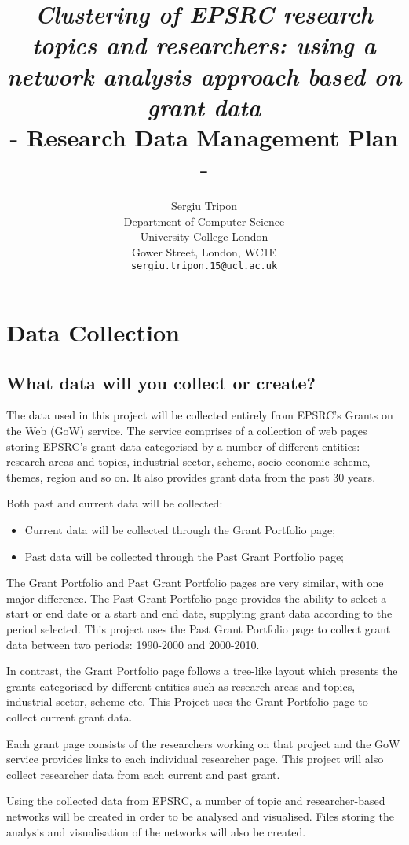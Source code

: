 \documentclass{article} %
\title{\textit{Clustering of EPSRC research topics and researchers: \normalfont using a network analysis approach based on grant data}\\- Research Data Management Plan -}
\author{
Sergiu Tripon\\
Department of Computer Science\\
University College London\\
Gower Street, London, WC1E\\
\texttt{sergiu.tripon.15@ucl.ac.uk}\\
}
\begin{document}
\maketitle

\section{Data Collection}

\subsection{What data will you collect or create?}

The data used in this project will be collected entirely from EPSRC’s Grants on the Web (GoW) service. The service comprises of a collection of web pages storing EPSRC’s grant data categorised by a number of different entities: research areas and topics, industrial sector, scheme, socio-economic scheme, themes, region and so on. It also provides grant data from the past 30 years.

Both past and current data will be collected:

\begin{itemize}
    \item Current data will be collected through the Grant Portfolio page;
    \item Past data will be collected through the Past Grant Portfolio page;
\end{itemize}

The Grant Portfolio and Past Grant Portfolio pages are very similar, with one major difference. The Past Grant Portfolio page provides the ability to select a start or end date or a start and end date, supplying grant data according to the period selected. This project uses the Past Grant Portfolio page to collect grant data between two periods: 1990-2000 and 2000-2010.

In contrast, the Grant Portfolio page follows a tree-like layout which presents the grants categorised by different entities such as research areas and topics, industrial sector, scheme etc. This Project uses the Grant Portfolio page to collect current grant data.

Each grant page consists of the researchers working on that project and the GoW service provides links to each individual researcher page. This project will also collect researcher data from each current and past grant.

Using the collected data from EPSRC, a number of topic and researcher-based networks will be created in order to be analysed and visualised. Files storing the analysis and visualisation of the networks will also be created.
\end{document}
